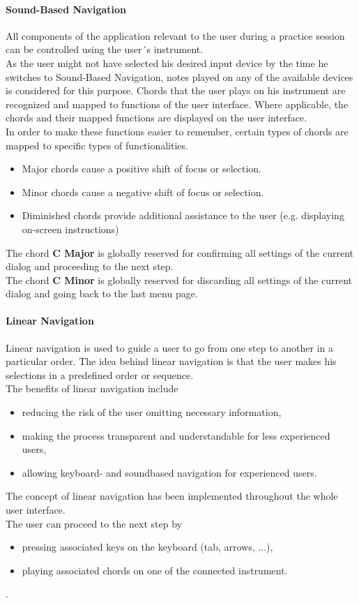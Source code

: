 \paragraph{Sound-Based Navigation}
All components of the application relevant to the user during a practice session can be controlled using the user´s instrument. \\
As the user might not have selected his desired input device by the time he switches to Sound-Based Navigation, notes played on any of the available devices is considered for this purpose.
Chords that the user plays on his instrument are recognized and mapped to functions of the user interface. Where applicable, the chords and their mapped functions are displayed on the user interface.\\
In order to make these functions easier to remember, certain types of chords are mapped to specific types of functionalities.
\begin {itemize}
	\item {Major chords cause a positive shift of focus or selection.}
	\item {Minor chords cause a negative shift of focus or selection.}
	\item {Diminished chords provide additional assistance to the user (e.g. displaying on-screen instructions)}
\end {itemize}
The chord \textbf{C Major} is globally reserved for confirming all settings of the current dialog and proceeding to the next step.\\
The chord \textbf{C Minor} is globally reserved for discarding all settings of the current dialog and going back to the last menu page. \\
\paragraph{Linear Navigation}
Linear navigation is used to guide a user to go from one step to another in a particular order. 
The idea behind linear navigation is that the user makes his selections in a predefined order or sequence. \\
The benefits of linear navigation include
\begin {itemize}
	\item { reducing the risk of the user omitting necessary information,}
	\item { making the process transparent and understandable for less experienced users,}
	\item { allowing keyboard- and soundbased navigation for experienced users.}
\end {itemize}
The concept of linear navigation has been implemented throughout the whole user interface. \\
The user can proceed to the next step by
\begin {itemize}
	\item {pressing associated keys on the keyboard (tab, arrows, ...),}
	\item {playing associated chords on one of the connected instrument.}
\end {itemize}.
